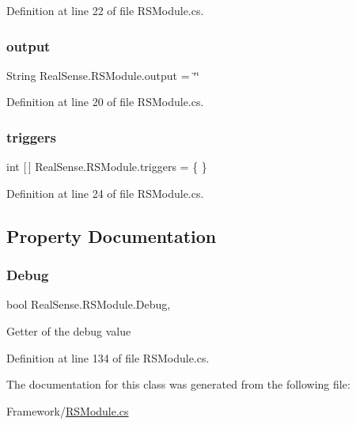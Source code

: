 Definition at line 22 of file R\+S\+Module.\+cs.

\mbox{\label{class_real_sense_1_1_r_s_module_a5f0ea0ffd2361fd2b792ed808a67f911}} 
\subsubsection{\texorpdfstring{output}{output}}
{\footnotesize\ttfamily String Real\+Sense.\+R\+S\+Module.\+output = \char`\"{}\char`\"{}}



Definition at line 20 of file R\+S\+Module.\+cs.

\mbox{\label{class_real_sense_1_1_r_s_module_a100988a1b957067db074dad8b4b9a078}} 
\subsubsection{\texorpdfstring{triggers}{triggers}}
{\footnotesize\ttfamily int \mbox{[}$\,$\mbox{]} Real\+Sense.\+R\+S\+Module.\+triggers = \{ \}}



Definition at line 24 of file R\+S\+Module.\+cs.



\subsection{Property Documentation}
\mbox{\label{class_real_sense_1_1_r_s_module_a89c9c568ab387b183a63ed2755a82203}} 
\subsubsection{\texorpdfstring{Debug}{Debug}}
{\footnotesize\ttfamily bool Real\+Sense.\+R\+S\+Module.\+Debug\hspace{0.3cm}{\ttfamily [get]}, {\ttfamily [set]}}

Getter of the debug value 

Definition at line 134 of file R\+S\+Module.\+cs.



The documentation for this class was generated from the following file\+:\begin{DoxyCompactItemize}
\item 
Framework/\hyperlink{_r_s_module_8cs}{R\+S\+Module.\+cs}\end{DoxyCompactItemize}
